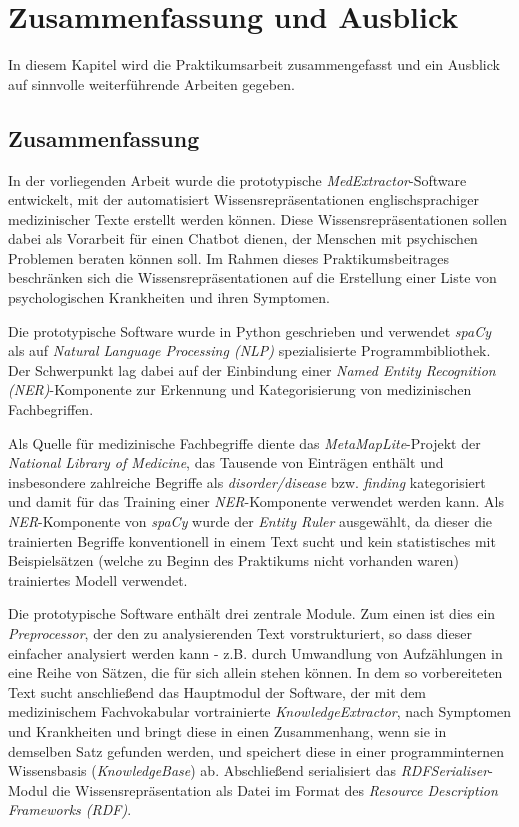 \chapter{Zusammenfassung und Ausblick}
\label{ch:zusammenfassung}



In diesem Kapitel wird die Praktikumsarbeit zusammengefasst und ein Ausblick auf sinnvolle weiterführende Arbeiten gegeben.




\section{Zusammenfassung}
\label{sec:Zusammenfassung} 

In der vorliegenden Arbeit wurde die prototypische \emph{MedExtractor}-Software entwickelt, mit der automatisiert Wissensrepräsentationen englischsprachiger medizinischer Texte erstellt werden können. Diese Wissensrepräsentationen sollen dabei als Vorarbeit für einen Chatbot dienen, der Menschen mit psychischen Problemen beraten können soll. Im Rahmen dieses Praktikumsbeitrages beschränken sich die Wissensrepräsentationen auf die Erstellung einer Liste von psychologischen Krankheiten und ihren Symptomen. 

Die prototypische Software wurde in Python geschrieben und verwendet \emph{spaCy} als  auf \emph{Natural Language Processing (NLP)} spezialisierte Programmbibliothek. Der Schwerpunkt lag dabei auf der Einbindung einer \emph{Named Entity Recognition (NER)}-Komponente zur Erkennung und Kategorisierung von medizinischen Fachbegriffen.

Als Quelle für medizinische Fachbegriffe diente das \emph{MetaMapLite}-Projekt der \emph{National Library of Medicine}, das Tausende von Einträgen enthält und insbesondere zahlreiche Begriffe als \emph{disorder/disease} bzw. \emph{finding} kategorisiert und damit für das Training einer \emph{NER}-Komponente verwendet werden kann. Als \emph{NER}-Komponente von \emph{spaCy} wurde der \emph{Entity Ruler} ausgewählt, da dieser die trainierten Begriffe konventionell in einem Text sucht und kein statistisches mit Beispielsätzen (welche zu Beginn des Praktikums nicht vorhanden waren) trainiertes Modell verwendet.

Die prototypische Software enthält drei zentrale Module. Zum einen ist dies ein \emph{Preprocessor}, der den zu analysierenden Text vorstrukturiert, so dass dieser einfacher analysiert werden kann - z.B. durch Umwandlung von Aufzählungen in eine Reihe von Sätzen, die für sich allein stehen können. In dem so vorbereiteten Text sucht anschließend das Hauptmodul der Software, der mit dem medizinischem Fachvokabular vortrainierte \emph{KnowledgeExtractor}, nach Symptomen und Krankheiten und bringt diese in einen Zusammenhang, wenn sie in demselben Satz gefunden werden, und speichert diese in einer programminternen Wissensbasis (\emph{KnowledgeBase}) ab. Abschließend serialisiert das \emph{RDFSerialiser}-Modul die Wissensrepräsentation als Datei im Format des \emph{Resource Description Frameworks (RDF)}.

